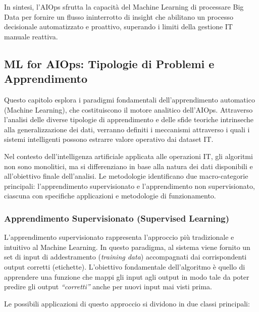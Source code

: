 In sintesi, l'AIOps sfrutta la capacità del Machine Learning di
processare Big Data per fornire un flusso ininterrotto di insight che
abilitano un processo decisionale automatizzato e proattivo, superando i
limiti della gestione IT manuale reattiva.

\subsection{ML for AIOps: Tipologie di Problemi e Apprendimento}

Questo capitolo esplora i paradigmi fondamentali dell'apprendimento
automatico (Machine Learning), che costituiscono il motore analitico
dell'AIOps. Attraverso l'analisi delle diverse tipologie di
apprendimento e delle sfide teoriche intrinseche alla generalizzazione
dei dati, verranno definiti i meccanismi attraverso i quali i sistemi
intelligenti possono estrarre valore operativo dai dataset IT.

Nel contesto dell'intelligenza artificiale applicata alle operazioni IT,
gli algoritmi non sono monolitici, ma si differenziano in base alla
natura dei dati disponibili e all'obiettivo finale dell'analisi. Le
metodologie identificano due macro-categorie principali:
l'apprendimento supervisionato e l'apprendimento non supervisionato,
ciascuna con specifiche applicazioni e metodologie di funzionamento.

\subsubsection{Apprendimento Supervisionato (Supervised Learning)}

L'apprendimento supervisionato rappresenta l'approccio più tradizionale
e intuitivo al Machine Learning. In questo paradigma, al sistema viene
fornito un set di input di addestramento (\textit{training data})
accompagnati dai corrispondenti output corretti (etichette).
L'obiettivo fondamentale dell'algoritmo è quello di apprendere una
funzione che mappi gli input agli output in modo tale da poter predire
gli output \textit{``corretti''} anche per nuovi input mai visti prima.

Le possibili applicazioni di questo approccio si dividono in due classi principali:

